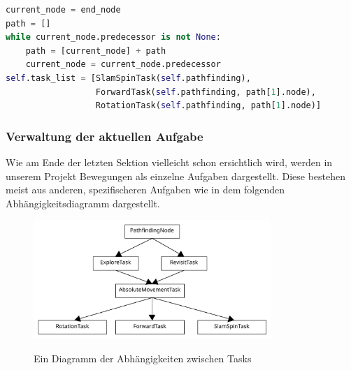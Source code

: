 \begin{lstlisting}[language=python,label={lst:pathfinding}]
current_node = end_node
path = []
while current_node.predecessor is not None:
    path = [current_node] + path
    current_node = current_node.predecessor
self.task_list = [SlamSpinTask(self.pathfinding),
                  ForwardTask(self.pathfinding, path[1].node),
                  RotationTask(self.pathfinding, path[1].node)]
\end{lstlisting}
\subsubsection{Verwaltung der aktuellen Aufgabe} \label{subsubsec:taskmanagement}
Wie am Ende der letzten Sektion vielleicht schon ersichtlich wird, werden in unserem Projekt Bewegungen als einzelne
Aufgaben dargestellt.
Diese bestehen meist aus anderen, spezifischeren Aufgaben wie in dem folgenden Abhängigkeitsdiagramm dargestellt.
\begin{figure}[h]
    \caption{Ein Diagramm der Abhängigkeiten zwischen Tasks}
\includegraphics[width=0.8\textwidth]{img/TaskDiagram}\label{fig:taskdiagram}
\centering
\end{figure}

